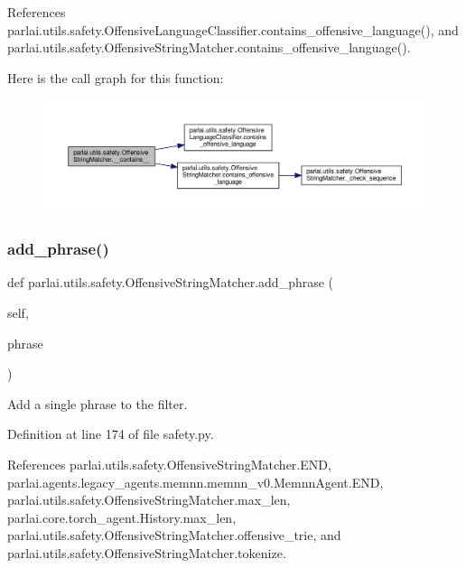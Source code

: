 References parlai.\+utils.\+safety.\+Offensive\+Language\+Classifier.\+contains\+\_\+offensive\+\_\+language(), and parlai.\+utils.\+safety.\+Offensive\+String\+Matcher.\+contains\+\_\+offensive\+\_\+language().

Here is the call graph for this function\+:
\nopagebreak
\begin{figure}[H]
\begin{center}
\leavevmode
\includegraphics[width=350pt]{classparlai_1_1utils_1_1safety_1_1OffensiveStringMatcher_a89e75aea403630f53f41502fead9708e_cgraph}
\end{center}
\end{figure}
\mbox{\label{classparlai_1_1utils_1_1safety_1_1OffensiveStringMatcher_a9272830360cad4f382c2350dd39b3e6e}} 
\subsubsection{\texorpdfstring{add\+\_\+phrase()}{add\_phrase()}}
{\footnotesize\ttfamily def parlai.\+utils.\+safety.\+Offensive\+String\+Matcher.\+add\+\_\+phrase (\begin{DoxyParamCaption}\item[{}]{self,  }\item[{}]{phrase }\end{DoxyParamCaption})}

\begin{DoxyVerb}Add a single phrase to the filter.\end{DoxyVerb}
 

Definition at line 174 of file safety.\+py.



References parlai.\+utils.\+safety.\+Offensive\+String\+Matcher.\+E\+ND, parlai.\+agents.\+legacy\+\_\+agents.\+memnn.\+memnn\+\_\+v0.\+Memnn\+Agent.\+E\+ND, parlai.\+utils.\+safety.\+Offensive\+String\+Matcher.\+max\+\_\+len, parlai.\+core.\+torch\+\_\+agent.\+History.\+max\+\_\+len, parlai.\+utils.\+safety.\+Offensive\+String\+Matcher.\+offensive\+\_\+trie, and parlai.\+utils.\+safety.\+Offensive\+String\+Matcher.\+tokenize.



